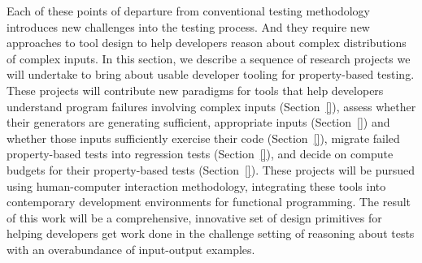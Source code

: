 Each of these points of departure from conventional testing methodology
introduces new challenges into the testing process. And they require new
approaches to tool design to help developers reason about complex distributions
of complex inputs. In this section, we describe a sequence of research projects
we will undertake to bring about usable developer tooling for property-based
testing. These projects will contribute new paradigms for tools that help
developers understand program failures involving complex inputs
(Section~\ref{}), assess whether their generators are generating sufficient,
appropriate inputs (Section~\ref{}) and whether those inputs sufficiently
exercise their code (Section~\ref{}), migrate failed property-based tests into
regression tests (Section~\ref{}), and decide on compute budgets for their
property-based tests (Section~\ref{}). These projects will be pursued using
human-computer interaction methodology, integrating these tools into
contemporary development environments for functional programming. The result of
this work will be a comprehensive, innovative set of design primitives for
helping developers get work done in the challenge setting of reasoning about
tests with an overabundance of input-output examples.




